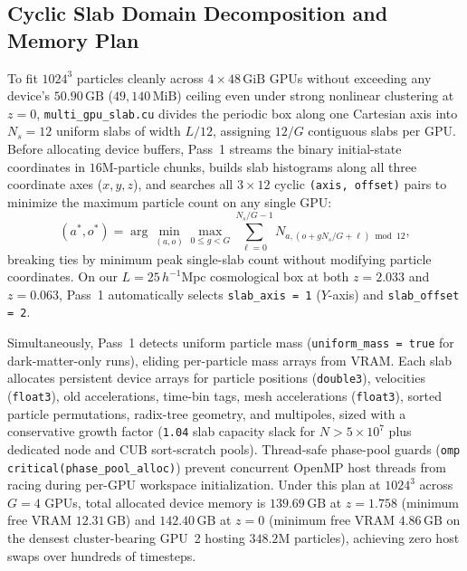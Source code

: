 \documentclass[aps,prd,reprint,superscriptaddress,nofootinbib,amsmath,amssymb,floatfix,longbibliography]{revtex4-2}
\begin{document}
\subsection{Cyclic Slab Domain Decomposition and Memory Plan}

To fit $1024^3$ particles cleanly across $4 \times 48\,\mathrm{GiB}$ GPUs without exceeding any device's $50.90\,\mathrm{GB}$ ($49{,}140\,\mathrm{MiB}$) ceiling even under strong nonlinear clustering at $z=0$, \texttt{multi\_gpu\_slab.cu} divides the periodic box along one Cartesian axis into $N_s = 12$ uniform slabs of width $L/12$, assigning $12/G$ contiguous slabs per GPU. Before allocating device buffers, Pass~1 streams the binary initial-state coordinates in $16\mathrm{M}$-particle chunks, builds slab histograms along all three coordinate axes ($x, y, z$), and searches all $3 \times 12$ cyclic \texttt{(axis, offset)} pairs to minimize the maximum particle count on any single GPU:
\begin{equation}
  (a^*, o^*) = \arg\min_{(a,o)} \max_{0 \le g < G}
  \sum_{\ell=0}^{N_s/G - 1} N_{a, (o + g N_s/G + \ell)\bmod 12},
\end{equation}
breaking ties by minimum peak single-slab count without modifying particle coordinates. On our $L = 25\,h^{-1}\mathrm{Mpc}$ cosmological box at both $z = 2.033$ and $z = 0.063$, Pass~1 automatically selects \texttt{slab\_axis = 1} ($Y$-axis) and \texttt{slab\_offset = 2}.

Simultaneously, Pass~1 detects uniform particle mass (\texttt{uniform\_mass = true} for dark-matter-only runs), eliding per-particle mass arrays from VRAM. Each slab allocates persistent device arrays for particle positions (\texttt{double3}), velocities (\texttt{float3}), old accelerations, time-bin tags, mesh accelerations (\texttt{float3}), sorted particle permutations, radix-tree geometry, and multipoles, sized with a conservative growth factor (\texttt{1.04} slab capacity slack for $N > 5 \times 10^7$ plus dedicated node and CUB sort-scratch pools). Thread-safe phase-pool guards (\texttt{omp critical(phase\_pool\_alloc)}) prevent concurrent OpenMP host threads from racing during per-GPU workspace initialization. Under this plan at $1024^3$ across $G=4$ GPUs, total allocated device memory is $139.69\,\mathrm{GB}$ at $z = 1.758$ (minimum free VRAM $12.31\,\mathrm{GB}$) and $142.40\,\mathrm{GB}$ at $z = 0$ (minimum free VRAM $4.86\,\mathrm{GB}$ on the densest cluster-bearing GPU~2 hosting $348.2\mathrm{M}$ particles), achieving zero host swaps over hundreds of timesteps.
\end{document}
